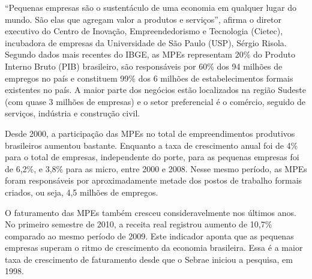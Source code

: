 “Pequenas empresas são o sustentáculo de uma economia em qualquer lugar do mundo. São elas que agregam valor a produtos e serviços”, afirma o diretor executivo do Centro de Inovação, Empreendedorismo e Tecnologia (Cietec), incubadora de empresas da Universidade de São Paulo (USP), Sérgio Risola. Segundo dados mais recentes do IBGE, as MPEs representam 20\% do Produto Interno Bruto (PIB) brasileiro, são responsáveis por 60\% dos 94 milhões de empregos no país e constituem 99\% dos 6 milhões de estabelecimentos formais existentes no país. A maior parte dos negócios estão localizados na região Sudeste (com quase 3 milhões de empresas) e o setor preferencial é o comércio, seguido de serviços, indústria e construção civil.

Desde 2000, a participação das MPEs no total de empreendimentos produtivos brasileiros aumentou bastante. Enquanto a taxa de crescimento anual foi de 4\% para o total de empresas, independente do porte, para as pequenas empresas foi de 6,2\%, e 3,8\% para as micro, entre 2000 e 2008. Nesse mesmo período, as MPEs foram responsáveis por aproximadamente metade dos postos de trabalho formais criados, ou seja, 4,5 milhões de empregos.

O faturamento das MPEs também cresceu consideravelmente nos últimos anos. No primeiro semestre de 2010, a receita real registrou aumento de 10,7\% comparado ao mesmo período de 2009. Este indicador aponta que as pequenas empresas superam o ritmo de crescimento da economia brasileira. Essa é a maior taxa de crescimento de faturamento desde que o Sebrae iniciou a pesquisa, em 1998.